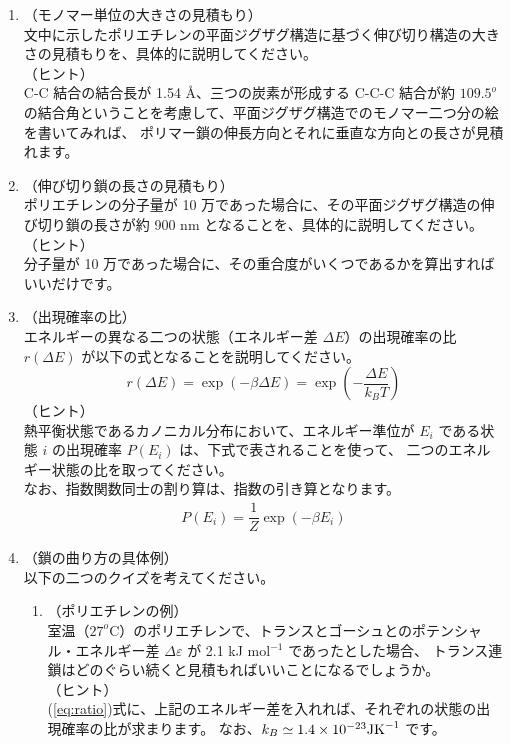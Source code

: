 \documentclass[11pt]{jsarticle}
\begin{document}
	\begin{enumerate}
		\item
		\label{it:2-1}
		（モノマー単位の大きさの見積もり）\\
		文中に示したポリエチレンの平面ジグザグ構造に基づく伸び切り構造の大きさの見積もりを、具体的に説明してください。\\
		（ヒント）\\
		C-C 結合の結合長が 1.54 \AA、三つの炭素が形成する C-C-C 結合が約 $109.5^o$ の結合角ということを考慮して、平面ジグザグ構造でのモノマー二つ分の絵を書いてみれば、
		ポリマー鎖の伸長方向とそれに垂直な方向との長さが見積れます。

		\item
		\label{it:2-2}
		（伸び切り鎖の長さの見積もり）\\
		ポリエチレンの分子量が 10 万であった場合に、その平面ジグザグ構造の伸び切り鎖の長さが約 900 nm となることを、具体的に説明してください。\\
		（ヒント）\\
		分子量が 10 万であった場合に、その重合度がいくつであるかを算出すればいいだけです。

		\item
		\label{it:2-3}
		（出現確率の比）\\
		エネルギーの異なる二つの状態（エネルギー差 $\Delta E$）の出現確率の比 $r(\Delta E)$ が以下の式となることを説明してください。
		\begin{equation*}
		r(\Delta E) = \exp(-\beta \Delta E)=\exp \left( -\dfrac{\Delta E}{k_B T} \right)
		\end{equation*}
		（ヒント）\\
		熱平衡状態であるカノニカル分布において、エネルギー準位が $E_i$ である状態 $i$ の出現確率 $P(E_i)$ は、下式で表されることを使って、
		二つのエネルギー状態の比を取ってください。\\
		なお、指数関数同士の割り算は、指数の引き算となります。
		\begin{align*}
		P(E_i) = \dfrac{1}{Z} \exp(-\beta E_i)
		\end{align*}

		\item
		（鎖の曲り方の具体例）\\
		以下の二つのクイズを考えてください。

		\begin{enumerate}
			\item
			\label{it:2-4}
			（ポリエチレンの例）\\
			室温（$27^o$C）のポリエチレンで、トランスとゴーシュとのポテンシャル・エネルギー差 $\Delta \varepsilon$ が 2.1 kJ mol$^{-1}$ であったとした場合、
			トランス連鎖はどのぐらい続くと見積もればいいことになるでしょうか。\\
			（ヒント）\\
			(\ref{eq:ratio})式に、上記のエネルギー差を入れれば、それぞれの状態の出現確率の比が求まります。
			なお、$k_B \simeq 1.4 \times 10^{-23} {\rm J K}^{-1}$ です。 


\end{enumerate}
\end{enumerate}
\end{document}

